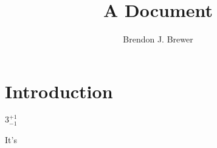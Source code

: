 \documentclass[letterpaper, 11pt]{article}
\title{A Document}
\author{Brendon J. Brewer}
\begin{document}
\maketitle

\section{Introduction}

$3^{+1}_{-1}$

It's

\begin{thebibliography}{99}
\end{thebibliography}
\end{document}
